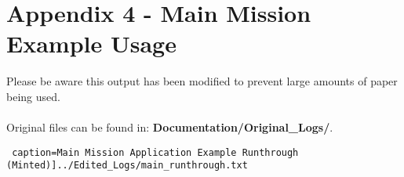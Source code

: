\documentclass{article}
\begin{document}
\section*{Appendix 4 - Main Mission Example Usage}

Please be aware this output has been modified to prevent large amounts of paper being used.\\\\
Original files can be found in: \textbf{Documentation/Original\_Logs/}.

\texttt{ caption=Main Mission Application Example Runthrough (Minted)]{../Edited_Logs/main_runthrough.txt}}
\end{document}
